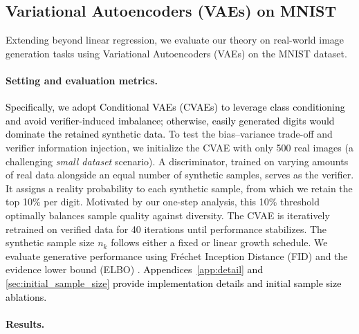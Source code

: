 \subsection{Variational Autoencoders (VAEs) on MNIST}
Extending beyond linear regression, we evaluate our theory on real-world image generation tasks using Variational Autoencoders (VAEs) on the MNIST dataset.
\vspace{-3mm}
\paragraph{Setting and evaluation metrics.} 
\textcolor{black}{Specifically, we adopt Conditional VAEs (CVAEs) to leverage class conditioning and avoid verifier-induced imbalance; otherwise, easily generated digits would dominate the retained synthetic data.}
To test the bias--variance trade-off and verifier information injection, we initialize the CVAE with only 500 real images (a challenging \emph{small dataset} scenario). 
A discriminator, trained on varying amounts of real data alongside an equal number of synthetic samples, serves as the verifier.
It assigns a reality probability to each synthetic sample, from which we retain the top 10\% per digit.
Motivated by our one-step analysis, this 10\% threshold optimally balances sample quality against diversity.
The CVAE is iteratively retrained on verified data for 40 iterations until performance stabilizes.
The synthetic sample size $n_k$ follows either a fixed or linear growth schedule.
We evaluate generative performance using Fr\'echet Inception Distance (FID) \citep{heusel2017gans} and the evidence lower bound (ELBO) \citep{kingmaauto2014}.
\textcolor{black}{Appendices~\ref{app:detail} and \ref{sec:initial_sample_size} provide implementation details and initial sample size ablations.}
\vspace{-3mm}
\paragraph{Results.}

